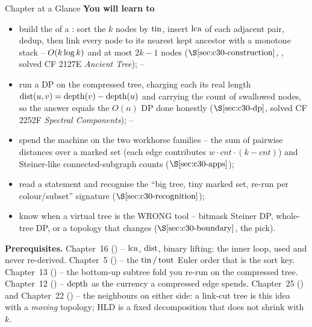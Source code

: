 \begin{chaptertheorybox}{Chapter at a Glance}
\textbf{You will learn to}
\begin{itemize}[nosep]
  \item build the  of a : sort the \(k\) nodes by
        \(\operatorname{tin}\), insert \(\operatorname{lca}\) of each adjacent pair, dedup, then link every node
        to its nearest kept ancestor with a monotone stack -- \(O(k\log k)\) and
        at most \(2k-1\) nodes (\(\secref{c30-construction}\), ,
        solved CF 2127E \emph{Ancient Tree}); \hfill{}--
  \item run a DP on the compressed tree, charging each  its real
        length \(\operatorname{dist}(u,v)=\operatorname{depth}(v)-\operatorname{depth}(u)\) and carrying the count of swallowed
        nodes, so the answer equals the \(O(n)\) DP done honestly (\(\secref{c30-dp}\),
        solved CF 2252F \emph{Spectral Components}); \hfill{}--
  \item spend the machine on the two workhorse families -- the sum of pairwise
        distances over a marked set (each edge contributes \(w\cdot\mathit{cnt}\cdot
        (k-\mathit{cnt})\)) and Steiner-like connected-subgraph counts
        (\(\secref{c30-apps}\)); \hfill{}
  \item read a statement and recognise the ``big tree, tiny marked set, re-run per
        colour/subset'' signature (\(\secref{c30-recognition}\)); \hfill{}
  \item know when a virtual tree is the WRONG tool -- bitmask Steiner DP, whole-tree
        DP, or a topology that changes (\(\secref{c30-boundary}\), the pick). \hfill{}
\end{itemize}

\textbf{Prerequisites.} Chapter~16 () -- \(\operatorname{lca}\), \(\operatorname{dist}\), binary
lifting: the inner loop, used and never re-derived.  Chapter~5 () -- the
\(\operatorname{tin}/\operatorname{tout}\) Euler order that is the sort key.  Chapter~13 () -- the
bottom-up subtree fold you re-run on the compressed tree.  Chapter~12 ()
-- \(\operatorname{depth}\) as the currency a compressed edge spends.  Chapter~25 ()
and Chapter~22 () -- the neighbours on either side: a link-cut tree is
this idea with a \emph{moving} topology; HLD is a fixed decomposition that does not
shrink with \(k\).
\end{chaptertheorybox}

